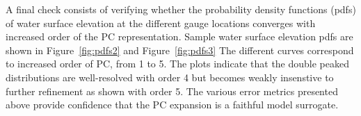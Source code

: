  
A final check consists of verifying whether the probability density
functions (pdfs) of water surface elevation at the different gauge locations
converges with increased order of the PC representation.  Sample
water surface elevation pdfs are shown in Figure~\ref{fig:pdfs2}
and Figure~\ref{fig:pdfs3}
The different curves correspond to increased order of PC, from 1 to 5.
The plots indicate that the double peaked distributions are
well-resolved with order 4 but becomes weakly insenstive to further refinement 
as shown with order 5. The various error metrics presented above 
provide confidence that the PC expansion is a faithful 
model surrogate. 

